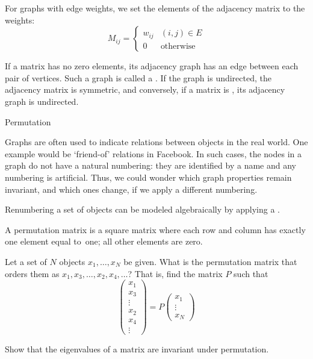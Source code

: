 For graphs with edge weights, we set the elements of the adjacency
matrix to the weights:
\[ 
  M_{ij}=
  \begin{cases}w_{ij}&(i,j)\in E\\ 0&\mbox{otherwise}\end{cases}
\]

If a matrix has no zero elements, its adjacency graph has an edge
between each pair of vertices. Such a graph is called a
.
If the graph is undirected, the adjacency matrix is symmetric, and
conversely, if a matrix is , its
adjacency graph is undirected.

 {Permutation}

Graphs are often used to indicate relations between objects in the 
real world. One example would be `friend-of' relations in Facebook.
In such cases, the nodes in a graph do not have a natural numbering:
they are identified by a name and any numbering is artificial.
Thus, we could wonder which graph properties remain invariant,
and which ones change, if we apply a different numbering.

Renumbering a set of objects can be modeled algebraically by
applying a .
\begin{definition}
A permutation matrix is a square matrix where each row and column
has exactly one element equal to~one; all other elements are zero.
\end{definition}

\begin{exercise}
Let a set of $N$ objects $x_1,\ldots,x_N$ be given. What is the 
permutation matrix that orders them as $x_1,x_3,\ldots,x_2,x_4,\ldots$?
That is, find the matrix $P$ such that
\[
\begin{pmatrix}
x_1\\x_3\\\vdots\\x_2\\x_4\\\vdots
\end{pmatrix} = P
\begin{pmatrix}
x_1\\\vdots\\x_N
\end{pmatrix}
\]
\end{exercise}

\begin{exercise}
Show that the eigenvalues of a matrix are invariant under permutation.
\end{exercise}

